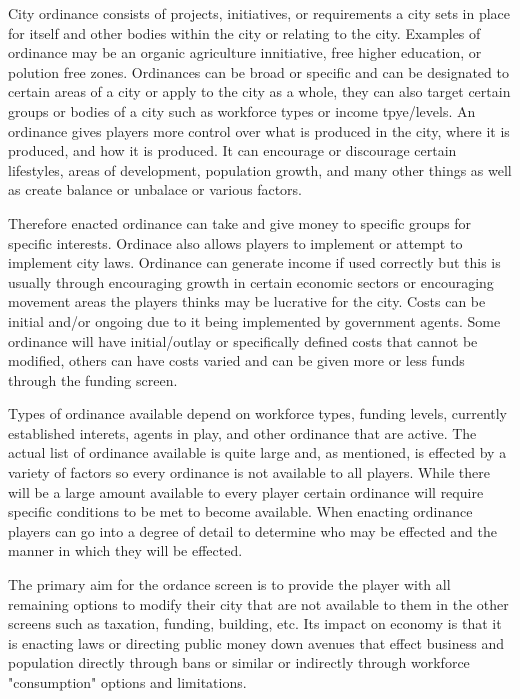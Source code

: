 
City ordinance consists of projects, initiatives, or requirements a city sets in place for itself and other bodies within the city or relating to the city. Examples of ordinance may be an organic agriculture innitiative, free higher education, or polution free zones. Ordinances can be broad or specific and can be designated to certain areas of a city or apply to the city as a whole, they can also target certain groups or bodies of a city such as workforce types or income tpye/levels. An ordinance gives players more control over what is produced in the city, where it is produced, and how it is produced. It can encourage or discourage certain lifestyles, areas of development, population growth, and many other things as well as create balance or unbalace or various factors.

Therefore enacted ordinance can take and give money to specific groups for specific interests. Ordinace also allows players to implement or attempt to implement city laws. Ordinance can generate income if used correctly but this is usually through encouraging growth in certain economic sectors or encouraging movement areas the players thinks may be lucrative for the city. Costs can be initial and/or ongoing due to it being implemented by government agents. Some ordinance will have initial/outlay or specifically defined costs that cannot be modified, others can have costs varied and can be given more or less funds through the funding screen. 


Types of ordinance available depend on workforce types, funding levels, currently established interets, agents in play, and other ordinance that are active. The actual list of ordinance available is quite large and, as mentioned, is effected by a variety of factors so every ordinance is not available to all players. While there will be a large amount available to every player certain ordinance will require specific conditions to be met to become available. When enacting ordinance players can go into a degree of detail to determine who may be effected and the manner in which they will be effected. 




The primary aim for the ordance screen is to provide the player with all remaining options to modify their city that are not available to them in the other screens such as taxation, funding, building, etc. Its impact on economy is that it is enacting laws or directing public money down avenues that effect business and population directly through bans or similar or indirectly through workforce "consumption" options and limitations.

